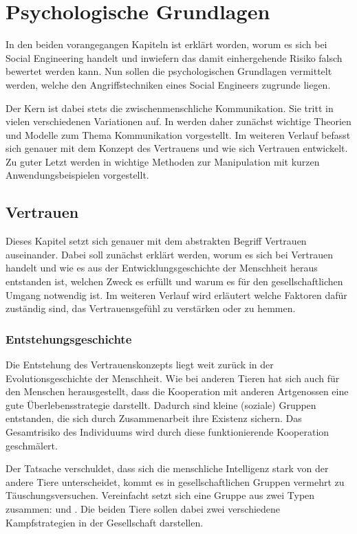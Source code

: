 \section{Psychologische Grundlagen}\label{sec:psychologische_grundlagen}

In den beiden vorangegangen Kapiteln ist erklärt worden, worum es sich bei Social Engineering handelt und inwiefern das damit einhergehende Risiko falsch bewertet werden kann. Nun sollen die psychologischen Grundlagen vermittelt werden, welche den Angriffstechniken eines Social Engineers zugrunde liegen.

Der Kern ist dabei stets die zwischenmenschliche Kommunikation. Sie tritt in vielen verschiedenen Variationen
auf. In  werden daher zunächst wichtige Theorien und Modelle zum Thema Kommunikation vorgestellt. Im weiteren Verlauf befasst sich  genauer mit dem Konzept des Vertrauens und wie sich Vertrauen entwickelt. Zu guter Letzt werden in  wichtige Methoden zur Manipulation mit kurzen Anwendungsbeispielen vorgestellt.

\subsection{Vertrauen}\label{sec:vertrauen}
Dieses Kapitel setzt sich genauer mit dem abstrakten Begriff Vertrauen auseinander. Dabei soll zunächst erklärt werden, worum es sich bei Vertrauen handelt und wie es aus der Entwicklungsgeschichte der Menschheit heraus entstanden ist, welchen Zweck es erfüllt und warum es für den gesellschaftlichen Umgang notwendig ist.
Im weiteren Verlauf wird erläutert welche Faktoren dafür zuständig sind, das Vertrauensgefühl zu verstärken oder zu hemmen.

\subsubsection{Entstehungsgeschichte}
Die Entstehung des Vertrauenskonzepts liegt weit zurück in der Evolutionsgeschichte der Menschheit.
Wie bei anderen Tieren hat sich auch für den Menschen herausgestellt, dass die Kooperation mit anderen Artgenossen eine gute Überlebensstrategie darstellt.
Dadurch sind kleine (soziale) Gruppen entstanden, die sich durch Zusammenarbeit ihre Existenz sichern.
Das Gesamtrisiko des Individuums wird durch diese funktionierende Kooperation geschmälert.
\cite{liars-and-outliers}

Der Tatsache verschuldet, dass sich die menschliche Intelligenz stark von der andere Tiere unterscheidet, kommt es in gesellschaftlichen Gruppen vermehrt zu Täuschungsversuchen. Vereinfacht setzt sich eine Gruppe aus zwei Typen zusammen:  und .
Die beiden Tiere sollen dabei zwei verschiedene Kampfstrategien in der Gesellschaft darstellen.

